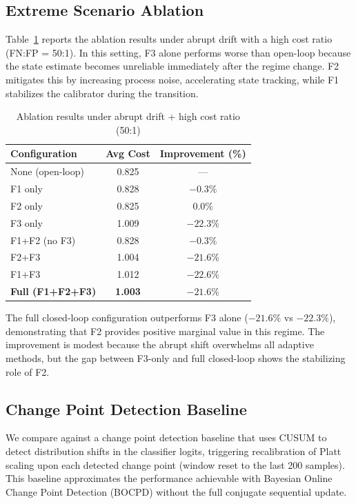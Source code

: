 \documentclass[12pt,a4paper]{article}
\begin{document}
\subsection{Extreme Scenario Ablation}

Table~\ref{tab:extreme_ablation} reports the ablation results under abrupt drift with a high cost ratio (FN:FP = 50:1). 
In this setting, F3 alone performs worse than open-loop because the state estimate becomes unreliable 
immediately after the regime change. F2 mitigates this by increasing process noise, accelerating state 
tracking, while F1 stabilizes the calibrator during the transition.

\begin{table}[h]
\centering
\caption{Ablation results under abrupt drift + high cost ratio (50:1)}
\label{tab:extreme_ablation}
\begin{tabular}{lcc}
\toprule
Configuration & Avg Cost & Improvement (\%) \\
\midrule
None (open-loop) & 0.825 & --- \\
F1 only & 0.828 & $-0.3\%$ \\
F2 only & 0.825 & $0.0\%$ \\
F3 only & 1.009 & $-22.3\%$ \\
F1+F2 (no F3) & 0.828 & $-0.3\%$ \\
F2+F3 & 1.004 & $-21.6\%$ \\
F1+F3 & 1.012 & $-22.6\%$ \\
\textbf{Full (F1+F2+F3)} & \textbf{1.003} & \textbf{$-21.6\%$} \\
\bottomrule
\end{tabular}
\end{table}

The full closed-loop configuration outperforms F3 alone ($-21.6\%$ vs $-22.3\%$), 
demonstrating that F2 provides positive marginal value in this regime. 
The improvement is modest because the abrupt shift overwhelms all adaptive methods, 
but the gap between F3-only and full closed-loop shows the stabilizing role of F2.



\subsection{Change Point Detection Baseline}

We compare against a change point detection baseline that uses CUSUM to detect 
distribution shifts in the classifier logits, triggering recalibration of Platt scaling 
upon each detected change point (window reset to the last 200 samples). 
This baseline approximates the performance achievable with Bayesian Online Change Point 
Detection (BOCPD) without the full conjugate sequential update.
\end{document}
